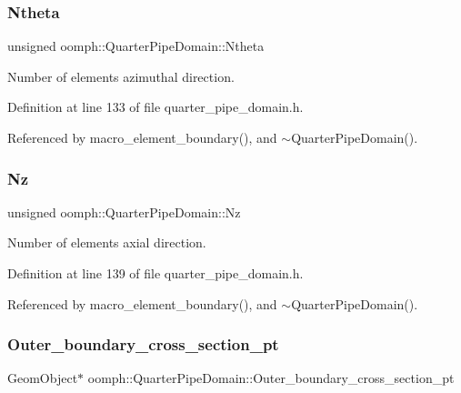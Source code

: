 \subsubsection{\texorpdfstring{Ntheta}{Ntheta}}
{\footnotesize\ttfamily unsigned oomph\+::\+Quarter\+Pipe\+Domain\+::\+Ntheta\hspace{0.3cm}{\ttfamily [private]}}



Number of elements azimuthal direction. 



Definition at line 133 of file quarter\+\_\+pipe\+\_\+domain.\+h.



Referenced by macro\+\_\+element\+\_\+boundary(), and $\sim$\+Quarter\+Pipe\+Domain().

\mbox{\label{classoomph_1_1QuarterPipeDomain_aab1bf3900c3537c44942e3fee0c3d24e}} 
\subsubsection{\texorpdfstring{Nz}{Nz}}
{\footnotesize\ttfamily unsigned oomph\+::\+Quarter\+Pipe\+Domain\+::\+Nz\hspace{0.3cm}{\ttfamily [private]}}



Number of elements axial direction. 



Definition at line 139 of file quarter\+\_\+pipe\+\_\+domain.\+h.



Referenced by macro\+\_\+element\+\_\+boundary(), and $\sim$\+Quarter\+Pipe\+Domain().

\mbox{\label{classoomph_1_1QuarterPipeDomain_adad2a4e638bb58eda89a19eaf5e18969}} 
\subsubsection{\texorpdfstring{Outer\+\_\+boundary\+\_\+cross\+\_\+section\+\_\+pt}{Outer\_boundary\_cross\_section\_pt}}
{\footnotesize\ttfamily Geom\+Object$\ast$ oomph\+::\+Quarter\+Pipe\+Domain\+::\+Outer\+\_\+boundary\+\_\+cross\+\_\+section\+\_\+pt\hspace{0.3cm}{\ttfamily [private]}}



